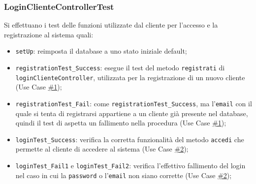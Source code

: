 \documentclass{article}
\newcommand{\code}[1]{\texttt{#1}}
\begin{document}
\subsubsection{LoginClienteControllerTest}
Si effettuano i test delle funzioni utilizzate dal cliente per l'accesso e la registrazione al sistema quali:  
\begin{itemize}
    \item \code{setUp}: reimposta il database a uno stato iniziale default;
    \item \code{registrationTest\_Success}: esegue il test del metodo \code{registrati} di \code{loginClienteController}, utilizzata per la registrazione di un nuovo cliente (Use Case \hyperref[use_case_1]{\#1});
    \item \code{registrationTest\_Fail}: come \code{registrationTest\_Success}, ma l'\code{email} con il quale si tenta di registrarsi appartiene a un cliente già presente nel database, quindi il test di aspetta un fallimento nella procedura (Use Case  \hyperref[use_case_1]{\#1});
    \item \code{loginTest\_Success}: verifica la corretta funzionalità del metodo \code{accedi} che permette al cliente di accedere al sistema (Use Case \hyperref[use_case_2]{\#2});
    \item \code{loginTest\_Fail1} e \code{loginTest\_Fail2}: verifica l'effettivo fallimento del login nel caso in cui la \code{password} o l'\code{email} non siano corrette (Use Case \hyperref[use_case_2]{\#2});    
\end{itemize}
\end{document}
